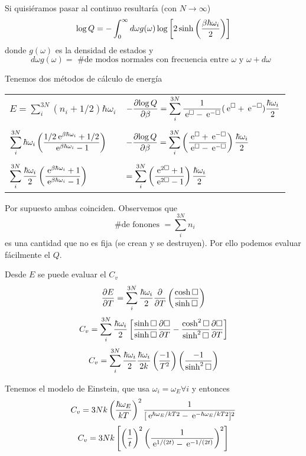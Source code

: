 \documentclass[10pt,oneside]{CBFT_book}
\begin{document}
Si quisiéramos pasar al continuo resultaría (con $N \to \infty$)
\[
	\log Q = - \int_0^\infty d\omega g(\omega) \log \left[ 2 \sinh \left( \frac{ \beta\hbar\omega_i }{ 2 } \right) \right]
\]
donde $ g(\omega) $ es la densidad de estados y 
\[
	d\omega g(\omega) = \text{ \# de modos normales con frecuencia entre $\omega$ y $\omega + d\omega$ }
\]

Tenemos dos métodos de cálculo de energía
\begin{center}
\begin{tabular}{l|l}
$ \displaystyle E = \sum_i^{3N} ( n_i + 1/2 )\hbar\omega_i $ & 
$ \displaystyle -\frac{\partial^{\hspace{-0.05em}} {\log Q}}{\partial {\beta}^{\hspace{-0.05em}}} = \sum_i^{3N} \frac{1}{\:\mathrm{e}^\Box - \:\mathrm{e}^{-\Box}}( \:\mathrm{e}^\Box + 
\:\mathrm{e}^{-\Box} )\frac{\hbar\omega_i}{2} $ \\
& \\
$ \displaystyle \sum_i^{3N} \hbar\omega_i\left( \frac{ 1/2\:\mathrm{e}^{\beta\hbar\omega_i}+1/2 }{ \:\mathrm{e}^{\beta\hbar\omega_i}-1 } \right) $  & 
$ \displaystyle -\frac{\partial^{\hspace{-0.05em}} {\log Q}}{\partial {\beta}^{\hspace{-0.05em}}} = \sum_i^{3N} \left( \frac{ \:\mathrm{e}^\Box + \:\mathrm{e}^{-\Box} }{ \:\mathrm{e}^\Box - \:\mathrm{e}^{-\Box} } \right) 
\frac{\hbar\omega_i}{2} $ \\
& \\
$ \displaystyle \sum_i^{3N} \frac{\hbar\omega_i}{2}\left( \frac{ \:\mathrm{e}^{\beta\hbar\omega_i}+1 }{ \:\mathrm{e}^{\beta\hbar\omega_i}-1 } \right) $ 
& $ \displaystyle = \sum_i^{3N} \left( \frac{ \:\mathrm{e}^{2\Box} + 1  }{  \:\mathrm{e}^{2\Box} - 1  } \right) \frac{\hbar\omega_i}{2} $ \\
\end{tabular}
\end{center}

Por supuesto ambas coinciden. Observemos que 
\[
	\text{ \# de fonones } = \sum_i^{3N} n_i
\]
es una cantidad que no es fija (se crean y se destruyen). Por ello podemos evaluar fácilmente el
$Q$.

Desde $E$ se puede evaluar el $C_v$
\[
	\frac{\partial^{\hspace{-0.05em}} {E}}{\partial {T}^{\hspace{-0.05em}}} = \sum_i^{3N} \frac{\hbar\omega_i}{2} \frac{\partial^{\hspace{-0.05em}} {}}{\partial {T}^{\hspace{-0.05em}}}\left( \frac{  \cosh \Box  }{  \sinh \Box  } \right) 
\]
\[
	C_v = \sum_i^{3N} \frac{\hbar\omega_i}{2} \left[ 
	\frac{ \sinh \Box }{ \sinh \Box }\frac{\partial^{\hspace{-0.05em}} {\Box}}{\partial {T}^{\hspace{-0.05em}}} - \frac{ \cosh^2 \Box }{ \sinh^2 \Box } \frac{\partial^{\hspace{-0.05em}} {\Box}}{\partial {T}^{\hspace{-0.05em}}}
	\right]
\]
\[
	C_v = \sum_i^{3N} \frac{\hbar\omega_i}{2}  \frac{\hbar\omega_i}{2k} \left( \frac{ -1 }{ T^2 } \right) 
	\left( \frac{ -1 }{ \sinh^2 \Box } \right)
\]

Tenemos el modelo de Einstein, que usa $ \omega_i = \omega_E \forall i $ y entonces 
\[
	C_v = 3N k \left( \frac{ \hbar\omega_E }{ kT } \right)^2 \frac{1}{[\:\mathrm{e}^{\hbar\omega_E/kT2} -\:\mathrm{e}^{-\hbar\omega_E/kT2}]^2}
\]
\[
	C_v = 3Nk \left[ \left( \frac{ 1 }{ t } \right)^2 \left( \frac{ 1 }{ \:\mathrm{e}^{1/(2t)}-\:\mathrm{e}^{-1/(2t)}  } \right)^2 \right]
\]
\end{document}
